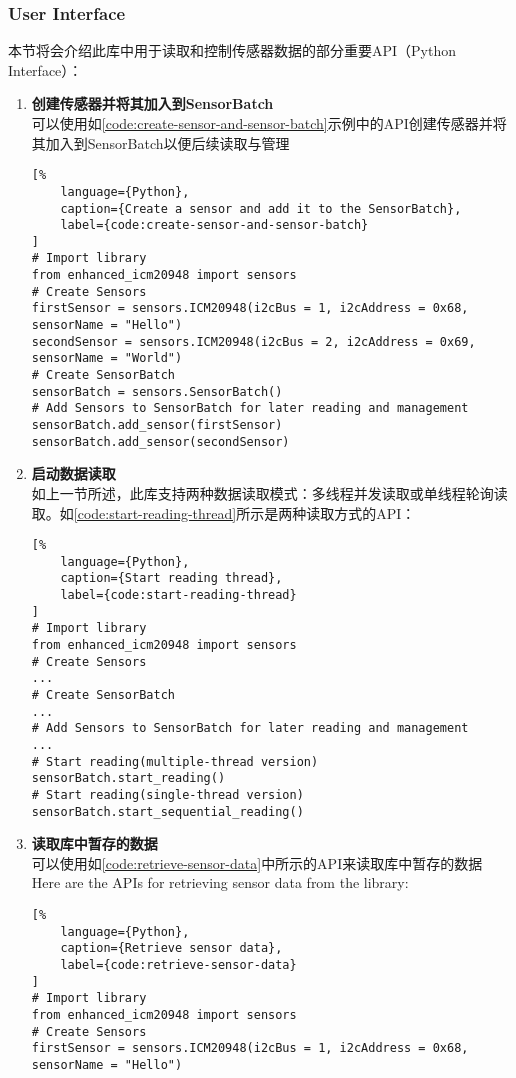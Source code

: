 \subsubsection{User Interface}
本节将会介绍此库中用于读取和控制传感器数据的部分重要API（Python Interface）：
\begin{enumerate}
    \item {\bfseries 创建传感器并将其加入到SensorBatch} \\
可以使用如\autoref{code:create-sensor-and-sensor-batch}示例中的API创建传感器并将其加入到SensorBatch以便后续读取与管理
\begin{lstlisting}[%
    language={Python},
    caption={Create a sensor and add it to the SensorBatch},
    label={code:create-sensor-and-sensor-batch}
]
# Import library
from enhanced_icm20948 import sensors
# Create Sensors
firstSensor = sensors.ICM20948(i2cBus = 1, i2cAddress = 0x68, sensorName = "Hello")
secondSensor = sensors.ICM20948(i2cBus = 2, i2cAddress = 0x69, sensorName = "World")
# Create SensorBatch
sensorBatch = sensors.SensorBatch()
# Add Sensors to SensorBatch for later reading and management
sensorBatch.add_sensor(firstSensor)
sensorBatch.add_sensor(secondSensor)
\end{lstlisting}
    \item {\bfseries 启动数据读取} \\
如上一节所述，此库支持两种数据读取模式：多线程并发读取或单线程轮询读取。如\autoref{code:start-reading-thread}所示是两种读取方式的API：
\begin{lstlisting}[%
    language={Python},
    caption={Start reading thread},
    label={code:start-reading-thread}
]
# Import library
from enhanced_icm20948 import sensors
# Create Sensors
...
# Create SensorBatch
...
# Add Sensors to SensorBatch for later reading and management
...
# Start reading(multiple-thread version)
sensorBatch.start_reading()
# Start reading(single-thread version)
sensorBatch.start_sequential_reading()
\end{lstlisting}
    \item {\bfseries 读取库中暂存的数据} \\
可以使用如\autoref{code:retrieve-sensor-data}中所示的API来读取库中暂存的数据
Here are the APIs for retrieving sensor data from the library:
\begin{lstlisting}[%
    language={Python},
    caption={Retrieve sensor data},
    label={code:retrieve-sensor-data}
]
# Import library
from enhanced_icm20948 import sensors
# Create Sensors
firstSensor = sensors.ICM20948(i2cBus = 1, i2cAddress = 0x68, sensorName = "Hello")

\end{lstlisting}
\end{enumerate}
